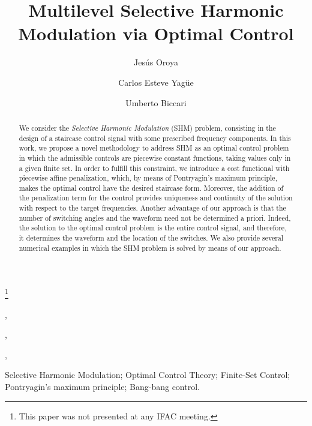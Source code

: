 \documentclass[twocolumn]{autart}    %
\begin{document}
\begin{frontmatter} 
 
\title{Multilevel Selective Harmonic Modulation via Optimal Control} %

\thanks[footnoteinfo]{This paper was not presented at any IFAC meeting.}

\author[UD]{Jes\'us Oroya},  %
\author[UAM,FD]{Carlos Esteve Yag\"ue},               %
\author[FD,UD]{Umberto Biccari},    %

\address[FD]{Chair of Computational Mathematics, Fundaci\'on Deusto, Avenida de las Universidades 24, 48007 Bilbao, Basque Country, Spain.}  %
\address[UD]{Universidad de Deusto, Avenida de las Universidades 24, 48007 Bilbao, Basque Country, Spain.}  %
\address[UAM]{Departamento de Matem\'aticas, Universidad Aut\'onoma de Madrid, 28049 Madrid, Spain.}  %
          
\begin{keyword}                           %
Selective Harmonic Modulation; Optimal Control Theory; Finite-Set Control; Pontryagin's maximum principle; Bang-bang control.    %
\end{keyword}                             %


\begin{abstract}%
We consider the \emph{Selective Harmonic Modulation} (SHM) problem, consisting in the design of a staircase control signal with some prescribed frequency components. In this work, we propose a novel methodology to  address SHM as an optimal control problem in which the admissible controls are piecewise constant functions, taking values only in a given finite set. In order to fulfill this constraint, we introduce a cost functional with piecewise affine penalization, which, by means of Pontryagin's maximum principle, makes the optimal control have the desired staircase form.  Moreover, the addition of the penalization term for the control provides uniqueness and continuity of the solution with respect to the target frequencies. Another advantage of our approach is that the number of switching angles and the waveform need not  be determined a priori.  Indeed, the solution to the optimal control problem is the entire control signal, and therefore, it determines the waveform and the location of the switches. We also provide several numerical examples in which the SHM problem is solved by means of our approach.
\end{abstract}


\end{frontmatter}
\end{document}
